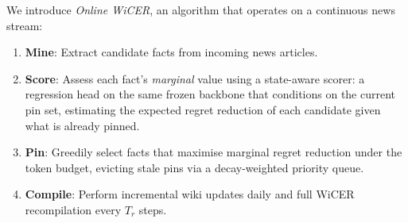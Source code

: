 \documentclass{article}
\begin{document}
We introduce \emph{Online WiCER}, an algorithm that operates on a continuous news stream:
\begin{enumerate}
  \item \textbf{Mine}: Extract candidate facts from incoming news articles.
  \item \textbf{Score}: Assess each fact's \emph{marginal} value using a state-aware scorer: a regression head on the same frozen backbone that conditions on the current pin set, estimating the expected regret reduction of each candidate given what is already pinned.
  \item \textbf{Pin}: Greedily select facts that maximise marginal regret reduction under the token budget, evicting stale pins via a decay-weighted priority queue.
  \item \textbf{Compile}: Perform incremental wiki updates daily and full WiCER recompilation every $T_r$ steps.
\end{enumerate}
\end{document}
